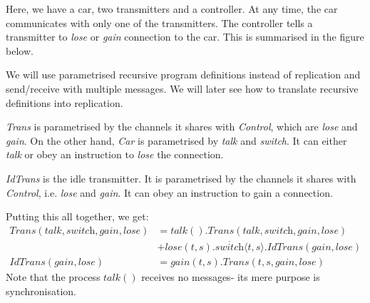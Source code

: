 \documentclass[a4paper, openany]{memoir}
\theoremstyle{definition}
\begin{document}
    Here, we have a car, two transmitters and a controller. At any time, the car communicates with only one of the transmitters. The controller tells a transmitter to \textit{lose} or \textit{gain} connection to the car. This is summarised in the figure below.
    \begin{figure}[H]
        \centering
    \end{figure}

    We will use parametrised recursive program definitions instead of replication and send/receive with multiple messages. We will later see how to translate recursive definitions into replication. 
    
    \textit{Trans} is parametrised by the channels it shares with \textit{Control}, which are \textit{lose} and \textit{gain}. On the other hand, \textit{Car} is parametrised by \textit{talk} and \textit{switch}. It can either \textit{talk} or obey an instruction to \textit{lose} the connection.

    \textit{IdTrans} is the idle transmitter. It is parametrised by the channels it shares with \textit{Control}, i.e. \textit{lose} and \textit{gain}. It can obey an instruction to gain a connection.

    Putting this all together, we get:
    \begin{align*}
        \textit{Trans}(\textit{talk}, \textit{switch}, \textit{gain}, \textit{lose}) &= \textit{talk}().\textit{Trans}(\textit{talk}, \textit{switch}, \textit{gain}, \textit{lose}) \\
        &+ \textit{lose}(t, s).\overline{\textit{switch}}\langle t, s \rangle.\textit{IdTrans}(\textit{gain}, \textit{lose}) \\
        \textit{IdTrans}(\textit{gain}, \textit{lose}) &= \textit{gain}(t, s).\textit{Trans}(t, s, \textit{gain}, \textit{lose})
    \end{align*}
    \noindent Note that the process $\textit{talk}()$ receives no messages- its mere purpose is synchronisation.
\end{document}
